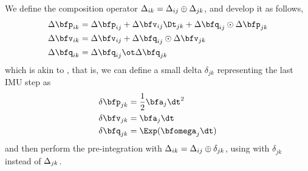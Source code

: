 We define the composition operator $\Delta_{ik} = \Delta_{ij}\oplus\Delta_{jk}$, and develop it as follows,
%
%
\begin{align} \label{equ:g_composition}
\begin{split}
\Dp_{ik} 
&= \Dp_{ij} + \Dv_{ij}\Dt_{jk} + \Dq_{ij}\od\Dp_{jk} \\
\Dv_{ik} 
&= \Dv_{ij} + \Dq_{ij}\od\Dv_{jk} \\
\Dq_{ik} 
&= \Dq_{ij}\ot\Dq_{jk} 
\end{split}
\end{align}
%
which is akin to , that is, we can define a small delta $\delta_{jk}$ representing the last IMU step as
%
\begin{align}
\begin{split}
\dpp_{jk} &= \frac12\bfa_j\dt^2 \\
\dv_{jk} &= \bfa_j\dt \\
\dq_{jk} &= \Exp(\bw_j\dt)
\end{split}
\end{align}
%
and then perform the pre-integration with $\Delta_{ik} = \Delta_{ij}\oplus\delta_{jk}$, using  with $\delta_{jk}$ instead of $\Delta_{jk}$.


